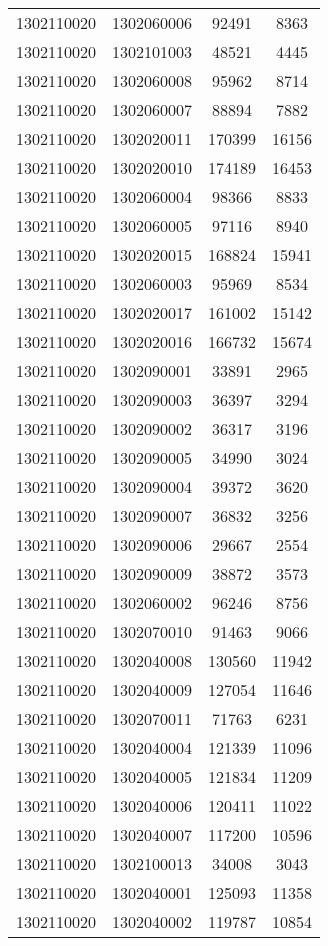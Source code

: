 \begin{longtable}{llcc}
1302110020 & 1302060006 & 92491 & 8363\\
1302110020 & 1302101003 & 48521 & 4445\\
1302110020 & 1302060008 & 95962 & 8714\\
1302110020 & 1302060007 & 88894 & 7882\\
1302110020 & 1302020011 & 170399 & 16156\\
1302110020 & 1302020010 & 174189 & 16453\\
1302110020 & 1302060004 & 98366 & 8833\\
1302110020 & 1302060005 & 97116 & 8940\\
1302110020 & 1302020015 & 168824 & 15941\\
1302110020 & 1302060003 & 95969 & 8534\\
1302110020 & 1302020017 & 161002 & 15142\\
1302110020 & 1302020016 & 166732 & 15674\\
1302110020 & 1302090001 & 33891 & 2965\\
1302110020 & 1302090003 & 36397 & 3294\\
1302110020 & 1302090002 & 36317 & 3196\\
1302110020 & 1302090005 & 34990 & 3024\\
1302110020 & 1302090004 & 39372 & 3620\\
1302110020 & 1302090007 & 36832 & 3256\\
1302110020 & 1302090006 & 29667 & 2554\\
1302110020 & 1302090009 & 38872 & 3573\\
1302110020 & 1302060002 & 96246 & 8756\\
1302110020 & 1302070010 & 91463 & 9066\\
1302110020 & 1302040008 & 130560 & 11942\\
1302110020 & 1302040009 & 127054 & 11646\\
1302110020 & 1302070011 & 71763 & 6231\\
1302110020 & 1302040004 & 121339 & 11096\\
1302110020 & 1302040005 & 121834 & 11209\\
1302110020 & 1302040006 & 120411 & 11022\\
1302110020 & 1302040007 & 117200 & 10596\\
1302110020 & 1302100013 & 34008 & 3043\\
1302110020 & 1302040001 & 125093 & 11358\\
1302110020 & 1302040002 & 119787 & 10854\\

\end{longtable}
